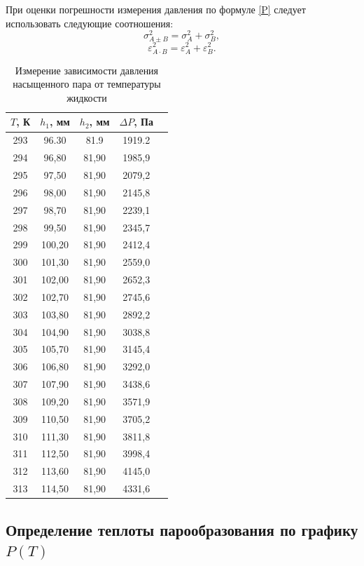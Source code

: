 \documentclass[12pt,a4paper]{article}
\begin{document}
При оценки погрешности измерения давления по формуле \eqref{P} следует использовать следующие соотношения:
\[ \sigma^2_{A\pm B} = \sigma^2_A+\sigma^2_B, \]
\[ \varepsilon^2_{A\cdot B} = \varepsilon^2_A+\varepsilon^2_B. \]

\begin{table}[H]
	\centering
	\begin{tabular}{|c|c|c|c|c|}
		\hline
		$ T $, К & $ h_1 $, мм & $ h_2 $, мм & $ \Delta P $, Па \\
		\hline
		293 & 96.30 & 81.9 & 1919.2 \\
		\hline
		294 & 96,80 & 81,90 & 1985,9 \\
		\hline 
		295 & 97,50 & 81,90 & 2079,2  \\
		\hline 
		296 & 98,00 & 81,90 & 2145,8  \\
		\hline 
		297 & 98,70 & 81,90 & 2239,1  \\
		\hline 
		298 & 99,50 & 81,90 & 2345,7 \\
		\hline
		299 & 100,20 & 81,90 & 2412,4 \\
		\hline
		300 & 101,30 & 81,90 & 2559,0 \\
		\hline
		301 & 102,00 & 81,90 & 2652,3 \\
		\hline
		302 & 102,70 & 81,90 & 2745,6 \\
		\hline
		303 & 103,80 & 81,90 & 2892,2 \\
		\hline
		304 & 104,90 & 81,90 & 3038,8 \\
		\hline
		305 & 105,70 & 81,90 & 3145,4 \\
		\hline
		306 & 106,80 & 81,90 & 3292,0 \\
		\hline
		307 & 107,90 & 81,90 & 3438,6 \\
		\hline
		308 & 109,20 & 81,90 & 3571,9 \\
		\hline
		309 & 110,50 & 81,90 & 3705,2 \\
		\hline
		310 & 111,30 & 81,90 & 3811,8 \\
		\hline
		311 & 112,50 & 81,90 & 3998,4 \\
		\hline
		312 & 113,60 & 81,90 & 4145,0 \\
		\hline
		313 & 114,50 & 81,90 & 4331,6 \\
		\hline
	\end{tabular}
	\caption{Измерение зависимости давления насыщенного пара от температуры жидкости}
	\label{tab:measures}
\end{table}

\subsection{Определение теплоты парообразования по графику $ P(T) $}
\end{document}
